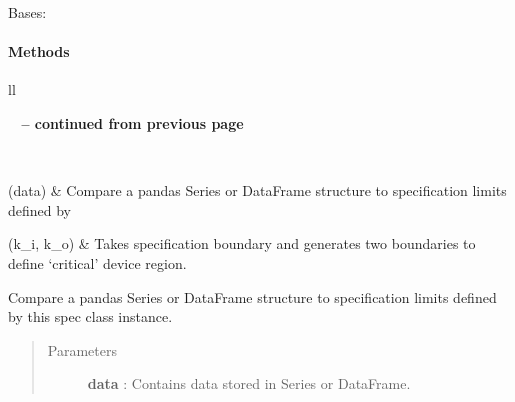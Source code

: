 \documentclass[letterpaper,10pt,english]{sphinxmanual}
\begin{document}
\begin{fulllineitems}
\label{qikify.models:qikify.models.specs.Specs}
Bases: 
\paragraph{Methods}

\begin{longtable}{ll}
\hline
\endfirsthead

%
{{\bfseries \tablename\ \thetable{} -- continued from previous page}} \\
\hline
\endhead

\hline {} \\ \hline
\endfoot

\hline
\endlastfoot


{\hyperref[qikify.models:qikify.models.specs.Specs.computePassFail]{}}(data)
 & 
Compare a pandas Series or DataFrame structure to specification limits defined by
\\\hline

{\hyperref[qikify.models:qikify.models.specs.Specs.genCriticalRegion]{}}(k\_i, k\_o)
 & 
Takes specification boundary and generates two boundaries to define `critical' device  region.
\\\hline
\end{longtable}


\begin{fulllineitems}
\label{qikify.models:qikify.models.specs.Specs.computePassFail}
Compare a pandas Series or DataFrame structure to specification limits defined by
this spec class instance.
\begin{quote}\begin{description}
\item[{Parameters }] \leavevmode
\textbf{data} : Contains data stored in Series or DataFrame.

\end{description}\end{quote}

\end{fulllineitems}


\end{fulllineitems}
\end{document}
